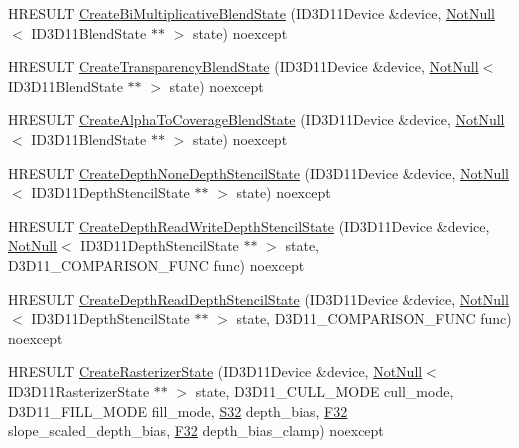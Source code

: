 \begin{DoxyCompactItemize}
\item 
H\+R\+E\+S\+U\+LT \mbox{\hyperlink{namespacemage_1_1rendering_a125875ab613be887bcac92544af5ce2c}{Create\+Bi\+Multiplicative\+Blend\+State}} (I\+D3\+D11\+Device \&device, \mbox{\hyperlink{namespacemage_a8769f9d670d6b585ea306cb1062af94b}{Not\+Null}}$<$ I\+D3\+D11\+Blend\+State $\ast$$\ast$ $>$ state) noexcept
\item 
H\+R\+E\+S\+U\+LT \mbox{\hyperlink{namespacemage_1_1rendering_a97b9c14e5432d4a011a6531e4d1f212e}{Create\+Transparency\+Blend\+State}} (I\+D3\+D11\+Device \&device, \mbox{\hyperlink{namespacemage_a8769f9d670d6b585ea306cb1062af94b}{Not\+Null}}$<$ I\+D3\+D11\+Blend\+State $\ast$$\ast$ $>$ state) noexcept
\item 
H\+R\+E\+S\+U\+LT \mbox{\hyperlink{namespacemage_1_1rendering_ab4c5ed61969db6f75ee2ba6278a04168}{Create\+Alpha\+To\+Coverage\+Blend\+State}} (I\+D3\+D11\+Device \&device, \mbox{\hyperlink{namespacemage_a8769f9d670d6b585ea306cb1062af94b}{Not\+Null}}$<$ I\+D3\+D11\+Blend\+State $\ast$$\ast$ $>$ state) noexcept
\item 
H\+R\+E\+S\+U\+LT \mbox{\hyperlink{namespacemage_1_1rendering_a82b9d81ffd0336c3632b38de1f6c31f3}{Create\+Depth\+None\+Depth\+Stencil\+State}} (I\+D3\+D11\+Device \&device, \mbox{\hyperlink{namespacemage_a8769f9d670d6b585ea306cb1062af94b}{Not\+Null}}$<$ I\+D3\+D11\+Depth\+Stencil\+State $\ast$$\ast$ $>$ state) noexcept
\item 
H\+R\+E\+S\+U\+LT \mbox{\hyperlink{namespacemage_1_1rendering_af52f9cc3d748ccd2218fd9358453bdcc}{Create\+Depth\+Read\+Write\+Depth\+Stencil\+State}} (I\+D3\+D11\+Device \&device, \mbox{\hyperlink{namespacemage_a8769f9d670d6b585ea306cb1062af94b}{Not\+Null}}$<$ I\+D3\+D11\+Depth\+Stencil\+State $\ast$$\ast$ $>$ state, D3\+D11\+\_\+\+C\+O\+M\+P\+A\+R\+I\+S\+O\+N\+\_\+\+F\+U\+NC func) noexcept
\item 
H\+R\+E\+S\+U\+LT \mbox{\hyperlink{namespacemage_1_1rendering_ae95b42c9a5b31ea08e13b654e0b50742}{Create\+Depth\+Read\+Depth\+Stencil\+State}} (I\+D3\+D11\+Device \&device, \mbox{\hyperlink{namespacemage_a8769f9d670d6b585ea306cb1062af94b}{Not\+Null}}$<$ I\+D3\+D11\+Depth\+Stencil\+State $\ast$$\ast$ $>$ state, D3\+D11\+\_\+\+C\+O\+M\+P\+A\+R\+I\+S\+O\+N\+\_\+\+F\+U\+NC func) noexcept
\item 
H\+R\+E\+S\+U\+LT \mbox{\hyperlink{namespacemage_1_1rendering_a1f15774b17d013568b2741738be9a32f}{Create\+Rasterizer\+State}} (I\+D3\+D11\+Device \&device, \mbox{\hyperlink{namespacemage_a8769f9d670d6b585ea306cb1062af94b}{Not\+Null}}$<$ I\+D3\+D11\+Rasterizer\+State $\ast$$\ast$ $>$ state, D3\+D11\+\_\+\+C\+U\+L\+L\+\_\+\+M\+O\+DE cull\+\_\+mode, D3\+D11\+\_\+\+F\+I\+L\+L\+\_\+\+M\+O\+DE fill\+\_\+mode, \mbox{\hyperlink{namespacemage_a2ef1a005a77358f1825d13fd481b557f}{S32}} depth\+\_\+bias, \mbox{\hyperlink{namespacemage_aa97e833b45f06d60a0a9c4fc22ae02c0}{F32}} slope\+\_\+scaled\+\_\+depth\+\_\+bias, \mbox{\hyperlink{namespacemage_aa97e833b45f06d60a0a9c4fc22ae02c0}{F32}} depth\+\_\+bias\+\_\+clamp) noexcept
$$
\end{DoxyCompactItemize}
